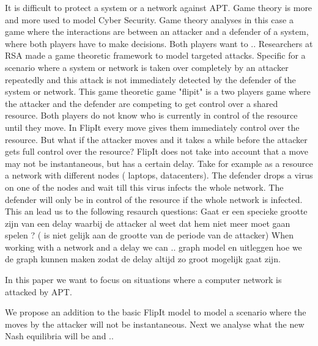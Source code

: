It is difficult to protect a system or a network against APT. 
Game theory is more and more used to model Cyber Security. Game theory analyses in this case a game where the interactions are between an attacker and a defender of a system, where both players have to make decisions. Both players want to ..  Researchers at RSA made a game theoretic framework to model targeted attacks. Specific for a scenario where a system or network is taken over completely by an attacker repeatedly and this attack is not immediately detected by the defender of the system or network. This game theoretic game "flipit" is a two players game where the attacker and the defender are competing to get control over a shared resource. Both players do not know who is currently in control of the resource until they move. In FlipIt every move gives them immediately control over the resource. But what if the attacker moves and it takes a while before the attacker gets full control over the resource? FlipIt does not take into account that a move may not be instantaneous, but has a certain delay. Take for example as a resource a network with different nodes ( laptops, datacenters). The defender drops a virus on one of the nodes and wait till this virus infects the whole network. The defender will only be in control of the resource if the whole network is infected. This an lead us to the following resaurch questions:
Gaat er een specieke grootte zijn van een delay waarbij de attacker al weet dat hem niet meer moet gaan spelen ? ( is niet gelijk aan de grootte van de periode van de attacker)
%
%
When working with a network and a delay we can .. graph model en uitleggen hoe we de graph kunnen maken zodat de delay altijd zo groot mogelijk gaat zijn. 

In this paper we want to focus on situations where a computer network is attacked by APT. 

We propose an addition to the basic FlipIt model to model a scenario where the moves by the attacker will not be instantaneous. Next we analyse what the new Nash equilibria will be and .. 


